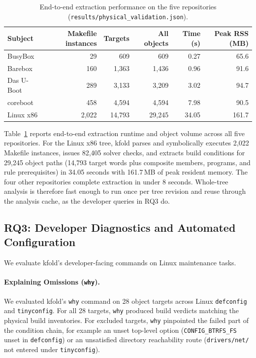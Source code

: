 \documentclass[acmsmall]{acmart}
\newcommand{\tool}{\textsf{kfold}\xspace}
\begin{document}
\begin{table}[t]
\centering\small
\caption{End-to-end extraction performance on the five repositories (\texttt{results/physical\_validation.json}).}
\label{tab:corpus-timing}
\begin{tabular}{@{}lrrrrr@{}}
\toprule
Subject & Makefile instances & Targets & All objects & Time (s) & Peak RSS (MB) \\
\midrule
BusyBox & 29 & 609 & 609 & 0.27 & 65.6 \\
Barebox & 160 & 1,363 & 1,436 & 0.96 & 91.6 \\
Das U-Boot & 289 & 3,133 & 3,209 & 3.02 & 94.7 \\
coreboot & 458 & 4,594 & 4,594 & 7.98 & 90.5 \\
Linux x86 & 2,022 & 14,793 & 29,245 & 34.05 & 161.7 \\
\bottomrule
\end{tabular}
\end{table}

Table~\ref{tab:corpus-timing} reports end-to-end extraction runtime and object volume across all five repositories.
For the Linux x86 tree, \tool parses and symbolically executes 2,022 Makefile instances, issues 82,405 solver checks, and extracts build conditions for 29,245 object paths (14,793 target words plus composite members, programs, and rule prerequisites) in 34.05 seconds with 161.7\,MB of peak resident memory.
The four other repositories complete extraction in under 8 seconds.
Whole-tree analysis is therefore fast enough to run once per tree revision and reuse through the analysis cache, as the developer queries in RQ3 do.

\subsection{RQ3: Developer Diagnostics and Automated Configuration}\label{sec:eval:developer}

We evaluate \tool's developer-facing commands on Linux maintenance tasks.

\paragraph{Explaining Omissions (\texttt{why}).}
We evaluated \tool's \texttt{why} command on 28 object targets across Linux \texttt{defconfig} and \texttt{tinyconfig}.
For all 28 targets, \texttt{why} produced build verdicts matching the physical build inventories.
For excluded targets, \texttt{why} pinpointed the failed part of the condition chain, for example an unset top-level option (\texttt{CONFIG\_BTRFS\_FS} unset in \texttt{defconfig}) or an unsatisfied directory reachability route (\texttt{drivers/net/} not entered under \texttt{tinyconfig}).
\end{document}
